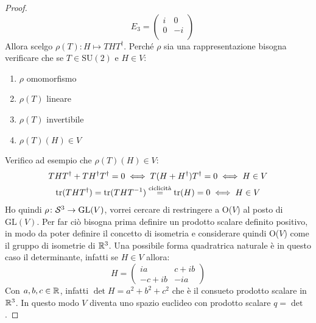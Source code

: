 \begin{proof}
\[    \quad
    E_3 =
    \begin{pmatrix}
      i & 0 \\
      0 & -i \\
    \end{pmatrix}
  \]
  Allora scelgo $ \rho(T) \colon H \mapsto THT^\dagger $.
  Perché $ \rho $ sia una rappresentazione bisogna verificare che se $ T \in \mathrm{SU(2)} $
  e $ H \in V $:
  \begin{enumerate}
  \item $ \rho $ omomorfismo
  \item $ \rho(T) $ lineare
  \item $ \rho(T) $ invertibile
  \item $ \rho(T)(H) \in V $
  \end{enumerate}
  Verifico ad esempio che $ \rho(T)(H) \in V $:
  \begin{gather*}
    THT^\dagger + TH^\dagger T^\dagger = 0 \iff T(H + H^\dagger)T^\dagger = 0 \iff H \in V \\
    \mathrm{tr}(THT^\dagger) = \mathrm{tr}(THT^{-1}) \overset{\text{ciclicità}}{=} \mathrm{tr}(H) = 0 \iff H \in V
  \end{gather*}
  Ho quindi $ \rho \colon \mathcal{S}^{3} \to \mathrm{GL}(V) $, vorrei cercare di restringere a
  O($ V $) al posto di $ \mathrm{GL}(V) $. Per far ciò bisogna prima definire un
  prodotto scalare definito positivo, in modo da poter definire il concetto di
  isometria e considerare quindi O($ V $) come il gruppo di isometrie di $ \mathbb{R}^{3} $.
  Una possibile forma quadratrica naturale è in questo caso il determinante,
  infatti se $ H \in V $ allora:
  \[
    H =
    \begin{pmatrix}
      i a & c + i b \\
      -c + i b & - i a
    \end{pmatrix}
  \]
  Con $ a,b,c \in \mathbb{R}^{} $, infatti $ \det{H} = a^2 + b^2 + c^2 $ che è il consueto
  prodotto scalare in $ \mathbb{R}^{3} $. In questo modo $ V $ diventa uno spazio euclideo
  con prodotto scalare $ q = \det $.


\end{proof}
